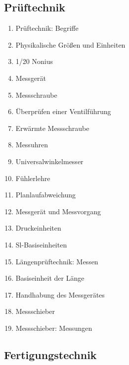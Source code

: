 \subsection{Prüftechnik}\label{prueftechnik}

\begin{enumerate}
\item
  Prüftechnik: Begriffe\\
\item
  Physikalische Größen und Einheiten\\
\item
  1/20 Nonius\\
\item
  Messgerät\\
\item
  Messschraube\\
\item
  Überprüfen einer Ventilführung\\
\item
  Erwärmte Messschraube\\
\item
  Messuhren\\
\item
  Universalwinkelmesser\\
\item
  Fühlerlehre\\
\item
  Planlaufabweichung\\
\item
  Messgerät und Messvorgang\\
\item
  Druckeinheiten\\
\item
  Sl-Basiseinheiten\\
\item
  Längenprüftechnik: Messen\\
\item
  Basiseinheit der Länge\\
\item
  Handhabung des Messgerätes\\
\item
  Messschieber\\
\item
  Messschieber: Messungen
\end{enumerate}

\subsection{Fertigungstechnik}\label{fertigungstechnik}

